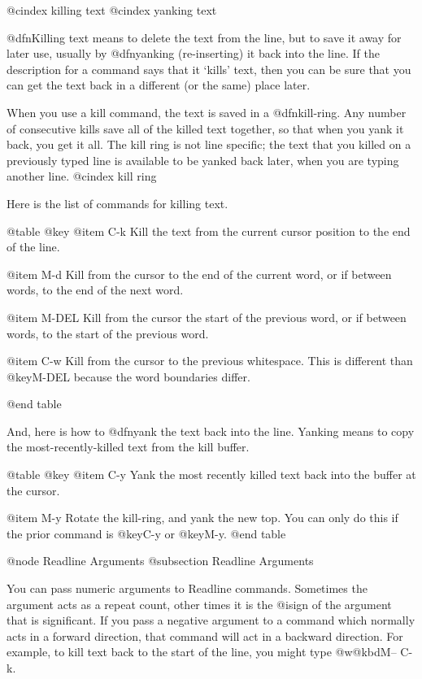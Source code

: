 @cindex killing text
@cindex yanking text

@dfn{Killing} text means to delete the text from the line, but to save
it away for later use, usually by @dfn{yanking} (re-inserting)
it back into the line.
If the description for a command says that it `kills' text, then you can
be sure that you can get the text back in a different (or the same)
place later.

When you use a kill command, the text is saved in a @dfn{kill-ring}.
Any number of consecutive kills save all of the killed text together, so
that when you yank it back, you get it all.  The kill
ring is not line specific; the text that you killed on a previously
typed line is available to be yanked back later, when you are typing
another line.
@cindex kill ring

Here is the list of commands for killing text.

@table @key
@item C-k
Kill the text from the current cursor position to the end of the line.

@item M-d
Kill from the cursor to the end of the current word, or if between
words, to the end of the next word.

@item M-DEL
Kill from the cursor the start of the previous word, or if between
words, to the start of the previous word.

@item C-w
Kill from the cursor to the previous whitespace.  This is different than
@key{M-DEL} because the word boundaries differ.

@end table

And, here is how to @dfn{yank} the text back into the line.  Yanking
means to copy the most-recently-killed text from the kill buffer.

@table @key
@item C-y
Yank the most recently killed text back into the buffer at the cursor.

@item M-y
Rotate the kill-ring, and yank the new top.  You can only do this if
the prior command is @key{C-y} or @key{M-y}.
@end table

@node Readline Arguments
@subsection Readline Arguments

You can pass numeric arguments to Readline commands.  Sometimes the
argument acts as a repeat count, other times it is the @i{sign} of the
argument that is significant.  If you pass a negative argument to a
command which normally acts in a forward direction, that command will
act in a backward direction.  For example, to kill text back to the
start of the line, you might type @w{@kbd{M-- C-k}}.

